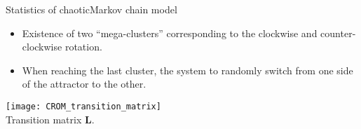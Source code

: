 \begin{frame}[t, c]{Statistics of chaotic}{Markov chain model}
  \begin{minipage}{.68\textwidth}
    \begin{itemize}
      
    \item Existence of two ``mega-clusters'' corresponding to the clockwise and counter-clockwise rotation.
      
      \medskip
      
    \item When reaching the last cluster, the system to randomly switch from one side of the attractor to the other.
    \end{itemize}
  \end{minipage}%
  \hfill
  \begin{minipage}{.28\textwidth}
    \centering
    \texttt{[image: CROM\_transition\_matrix]} \\
    
    {\small
      Transition matrix \( \bm{L} \).
    }
  \end{minipage}
  
  \vspace{1cm}
\end{frame}

